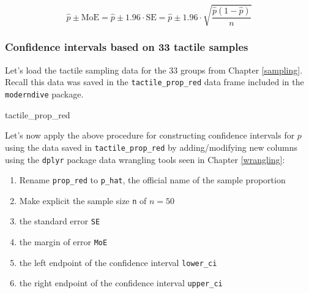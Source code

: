 \documentclass[12pt,]{krantz}
\makeatletter
\newenvironment{Shaded}{\begin{snugshade}}{\end{snugshade}}
\newcommand{\KeywordTok}[1]{\textcolor[rgb]{0.27,0.27,0.27}{\textbf{#1}}}
\newcommand{\DataTypeTok}[1]{\textcolor[rgb]{0.27,0.27,0.27}{#1}}
\newcommand{\DecValTok}[1]{\textcolor[rgb]{0.06,0.06,0.06}{#1}}
\newcommand{\FloatTok}[1]{\textcolor[rgb]{0.06,0.06,0.06}{#1}}
\newcommand{\StringTok}[1]{\textcolor[rgb]{0.5,0.5,0.5}{#1}}
\newcommand{\OperatorTok}[1]{\textcolor[rgb]{0.43,0.43,0.43}{\textbf{#1}}}
\newcommand{\NormalTok}[1]{#1}
\providecommand{\tightlist}{%
  \setlength{\itemsep}{0pt}\setlength{\parskip}{0pt}}
\newenvironment{kframe}{%
\medskip{}
\setlength{\fboxsep}{.8em}
 \def\at@end@of@kframe{}%
 \ifinner\ifhmode%
  \def\at@end@of@kframe{\end{minipage}}%
  \begin{minipage}{\columnwidth}%
 \fi\fi%
 \def\FrameCommand##1{\hskip\@totalleftmargin \hskip-\fboxsep
 \colorbox{shadecolor}{##1}\hskip-\fboxsep
     \hskip-\linewidth \hskip-\@totalleftmargin \hskip\columnwidth}%
 \MakeFramed {\advance\hsize-\width
   \@totalleftmargin\z@ \linewidth\hsize
   \@setminipage}}%
 {\par\unskip\endMakeFramed%
 \at@end@of@kframe}
\renewenvironment{Shaded}{\begin{kframe}}{\end{kframe}}
\theoremstyle{definition}
\theoremstyle{definition}
\theoremstyle{definition}
\theoremstyle{remark}
\makeatother
\begin{document}
\[
\widehat{p} \pm \text{MoE} = \widehat{p} \pm 1.96 \cdot \text{SE} = \widehat{p} \pm 1.96 \cdot \sqrt{\frac{\widehat{p}(1-\widehat{p})}{n}}
\]

\subsubsection*{Confidence intervals based on 33 tactile
samples}\label{confidence-intervals-based-on-33-tactile-samples}

Let's load the tactile sampling data for the 33 groups from Chapter
\ref{sampling}. Recall this data was saved in the
\texttt{tactile\_prop\_red} data frame included in the
\texttt{moderndive} package.

\begin{Shaded}
\begin{Highlighting}[]
\NormalTok{tactile_prop_red}
\end{Highlighting}
\end{Shaded}

Let's now apply the above procedure for constructing confidence
intervals for \(p\) using the data saved in \texttt{tactile\_prop\_red}
by adding/modifying new columns using the \texttt{dplyr} package data
wrangling tools seen in Chapter \ref{wrangling}:

\begin{enumerate}
\def\labelenumi{\arabic{enumi}.}
\tightlist
\item
  Rename \texttt{prop\_red} to \texttt{p\_hat}, the official name of the
  sample proportion
\item
  Make explicit the sample size \texttt{n} of \(n=50\)
\item
  the standard error \texttt{SE}
\item
  the margin of error \texttt{MoE}
\item
  the left endpoint of the confidence interval \texttt{lower\_ci}
\item
  the right endpoint of the confidence interval \texttt{upper\_ci}
\end{enumerate}

\begin{Shaded}
\end{Shaded}
\end{document}
